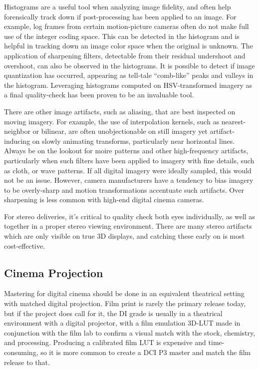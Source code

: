 Histograms are a useful tool when analyzing image fidelity, and often help forensically track down if post-processing has been applied to an image. For example, log frames from certain motion-picture cameras often do not make full use of the integer coding space. This can be detected in the histogram and is helpful in tracking down an image color space when the original is unknown. The application of sharpening filters, detectable from their residual undershoot and overshoot, can also be observed in the histograms. It is possible to detect if image quantization has occurred, appearing as tell-tale “comb-like” peaks and valleys in the histogram. Leveraging histograms computed on HSV-transformed imagery as a final quality-check has been proven to be an invaluable tool.

There are other image artifacts, such as aliasing, that are best inspected on moving imagery. For example, the use of interpolation kernels, such as nearest-neighbor or bilinear, are often unobjectionable on still imagery yet artifact-inducing on slowly animating transforms, particularly near horizontal lines. Always be on the lookout for moire patterns and other high-frequency artifacts, particularly when such filters have been applied to imagery with fine details, such as cloth, or wave patterns. If all digital imagery were ideally sampled, this would not be an issue. However, camera manufacturers have a tendency to bias imagery to be overly-sharp and motion transformations accentuate such artifacts. Over sharpening is less common with high-end digital cinema cameras.

For stereo deliveries, it’s critical to quality check both eyes individually, as well as together in a proper stereo viewing environment. There are many stereo artifacts which are only visible on true 3D displays, and catching these early on is most cost-effective.

\subsection{Cinema Projection}

Mastering for digital cinema should be done in an equivalent theatrical setting with matched digital projection. Film print is rarely the primary release today, but if the project does call for it, the DI grade is usually in a theatrical environment with a digital projector, with a film emulation 3D-LUT made in conjunction with the film lab to confirm a visual match with the stock, chemistry, and processing. Producing a calibrated film LUT is expensive and time-consuming, so it is more common to create a DCI P3 master and match the film release to that. 


